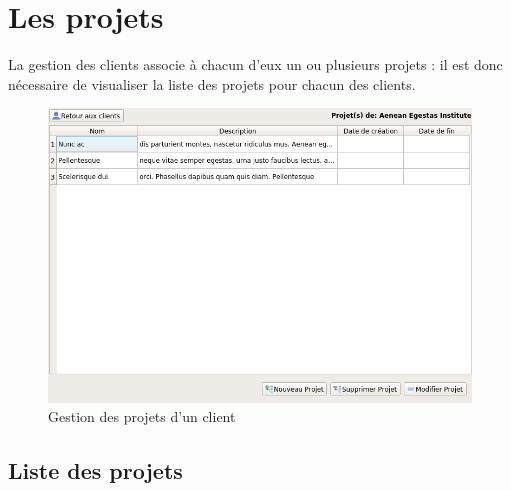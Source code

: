 \chapter{Les projets}
La gestion des clients associe à chacun d'eux un ou plusieurs projets : il est donc nécessaire de visualiser la liste des projets pour chacun des clients. 
\begin{figure}[H]
	\centering
	\includegraphics[width=12cm]{screens/projets.png}
	\caption{Gestion des projets d'un client}
\end{figure}

\section{Liste des projets}


